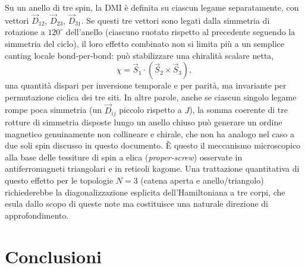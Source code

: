 \documentclass[11pt,a4paper]{article}
\begin{document}
Su un anello di tre spin, la DMI \`e definita su ciascun legame separatamente, con
vettori $\vec D_{12}$, $\vec D_{23}$, $\vec D_{31}$. Se questi tre vettori sono legati
dalla simmetria di rotazione a $120^\circ$ dell'anello (ciascuno ruotato rispetto al
precedente seguendo la simmetria del ciclo), il loro effetto combinato non si limita
pi\`u a un semplice canting locale bond-per-bond: pu\`o stabilizzare una chiralit\`a
scalare netta,
$$\chi = \vec S_1\cdot(\vec S_2\times\vec S_3),$$
una quantit\`a dispari per inversione temporale e per parit\`a, ma invariante per
permutazione ciclica dei tre siti. In altre parole, anche se ciascun singolo legame
rompe poca simmetria (un $\vec D_{ij}$ piccolo rispetto a $J$), la somma coerente di
tre rotture di simmetria disposte lungo un anello chiuso pu\`o generare un ordine
magnetico genuinamente non collineare e chirale, che non ha analogo nel caso a due
soli spin discusso in questo documento. \`E questo il meccanismo microscopico alla
base delle tessiture di spin a elica (\emph{proper-screw}) osservate in
antiferromagneti triangolari e in reticoli kagome. Una trattazione quantitativa di
questo effetto per le topologie $N=3$ (catena aperta e anello/triangolo) richiederebbe
la diagonalizzazione esplicita dell'Hamiltoniana a tre corpi, che esula dallo scopo di
queste note ma costituisce una naturale direzione di approfondimento.

\section{Conclusioni}
\end{document}
